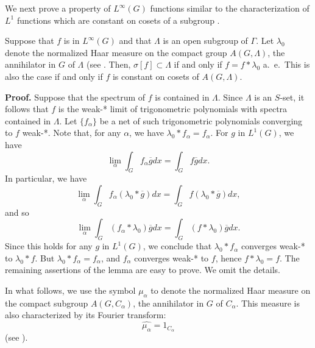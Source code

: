 \documentclass[12pt,leqno]{article}
\begin{document}
We next prove a property of $L^\infty(G)$ functions
similar to the characterization of $L^1$ functions which are
constant on cosets of a subgroup \cite[Theorem (28.55)]{hr2}.
\begin{prop}\label{proposition5.9}
Suppose that $f$ is in $L^\infty(G)$ and that $\Lambda$ is
an open subgroup of $\Gamma$.  Let $\lambda_0$ denote
the normalized Haar measure on the compact group
$A(G,\Lambda)$, the annihilator in $G$ of
$\Lambda$ (see \cite[(23.23)]{hr1}.  Then, $\sigma[f]\subset \Lambda$
if and only if $f=f*\lambda_0$ a.\ e.\   This is also
the case if and only if $f$ is constant on
cosets of $A(G,\Lambda)$.
\end{prop}
{\bf Proof.}  Suppose that the spectrum of $f$ is contained 
in $\Lambda$.  Since $\Lambda$
is an $S$-set, it follows that $f$
is the weak-* limit of trigonometric polynomials with
spectra contained in $\Lambda$.  Let $\{f_\alpha\}$ be a net
of such trigonometric polynomials converging 
to $f$ weak-*.  Note that, for any $\alpha$, 
we have $\lambda_0*f_\alpha=f_\alpha$.  For $g$ in $L^1(G)$, we have 
$$\lim_\alpha \int_G f_\alpha \overline{g}dx= \int_G f\overline{g}dx.$$
In particular, we have
$$\lim_\alpha \int_G f_\alpha 
(\lambda_0*\overline{g})dx= \int_G f
(\lambda_0*\overline{g})dx,$$
and so
$$\lim_\alpha \int_G (f_\alpha *\lambda_0) 
\overline{g}dx= \int_G (f*\lambda_0)
\overline{g}dx.$$
Since this holds for any $g$ in $L^1(G)$, we conclude that
$\lambda_0 *f_\alpha$ converges weak-* to $\lambda_0*f$.
But $\lambda_0*f_\alpha=f_\alpha$, and $f_\alpha$
converges weak-* to $f$, hence 
$f*\lambda_0=f$.  The remaining assertions of the 
lemma are easy to prove.  We omit the details.

In what follows, we use the symbol $\mu_\alpha$ to denote the
normalized Haar measure on the compact subgroup
$A(G,C_\alpha)$, the annihilator in $G$ of $C_\alpha$.  
This measure is also characterized by its Fourier
transform:
$$\widehat{\mu_\alpha}=1_{C_\alpha}$$
(see \cite[(23.19)]{hr1}).
\end{document}
